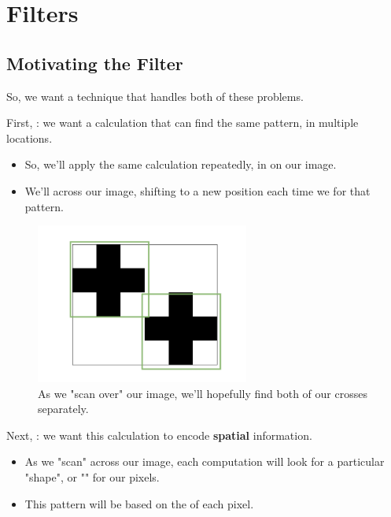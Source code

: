 \section{Filters}

    \subsection{Motivating the Filter}

        So, we want a technique that handles both of these problems. 
    
        First, : we want a calculation that can find the same pattern, in multiple locations.
    
        \begin{itemize}
            \item So, we'll apply the same calculation repeatedly, in  on our image.

            \item We'll  across our image, shifting to a new position each time we  for that pattern.
        \end{itemize}

        \begin{figure}[H]
            \centering
            \includegraphics[width=70mm,scale=0.5]{images/convolutional_neural_networks_images/twocross_find.png}
            
            \caption*{As we "scan over" our image, we'll hopefully find both of our crosses separately.}
        \end{figure}

        Next, : we want this calculation to encode \textbf{spatial} information.

        \begin{itemize}
            \item As we "scan" across our image, each computation will look for a particular "shape", or "" for our pixels.
            \item This pattern will be based on the  of each pixel.
        \end{itemize}

